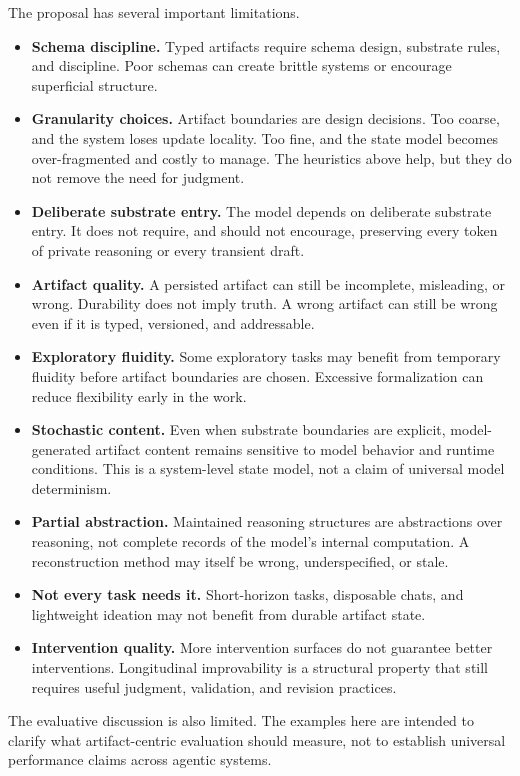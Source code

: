 \documentclass{article}
\begin{document}
The proposal has several important limitations.

\begin{itemize}
\item \textbf{Schema discipline.} Typed artifacts require schema design, substrate rules, and discipline. Poor schemas can create brittle systems or encourage superficial structure.
\item \textbf{Granularity choices.} Artifact boundaries are design decisions. Too coarse, and the system loses update locality. Too fine, and the state model becomes over-fragmented and costly to manage. The heuristics above help, but they do not remove the need for judgment.
\item \textbf{Deliberate substrate entry.} The model depends on deliberate substrate entry. It does not require, and should not encourage, preserving every token of private reasoning or every transient draft.
\item \textbf{Artifact quality.} A persisted artifact can still be incomplete, misleading, or wrong. Durability does not imply truth. A wrong artifact can still be wrong even if it is typed, versioned, and addressable.
\item \textbf{Exploratory fluidity.} Some exploratory tasks may benefit from temporary fluidity before artifact boundaries are chosen. Excessive formalization can reduce flexibility early in the work.
\item \textbf{Stochastic content.} Even when substrate boundaries are explicit, model-generated artifact content remains sensitive to model behavior and runtime conditions. This is a system-level state model, not a claim of universal model determinism.
\item \textbf{Partial abstraction.} Maintained reasoning structures are abstractions over reasoning, not complete records of the model's internal computation. A reconstruction method may itself be wrong, underspecified, or stale.
\item \textbf{Not every task needs it.} Short-horizon tasks, disposable chats, and lightweight ideation may not benefit from durable artifact state.
\item \textbf{Intervention quality.} More intervention surfaces do not guarantee better interventions. Longitudinal improvability is a structural property that still requires useful judgment, validation, and revision practices.
\end{itemize}

The evaluative discussion is also limited. The examples here are intended to clarify what artifact-centric evaluation should measure, not to establish universal performance claims across agentic systems.
\end{document}
